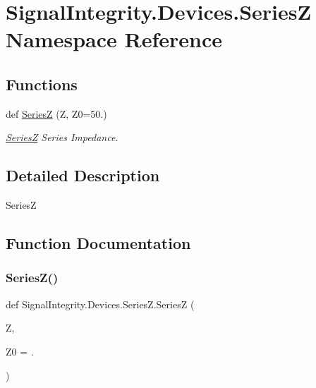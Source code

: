 \hypertarget{namespaceSignalIntegrity_1_1Devices_1_1SeriesZ}{}\section{Signal\+Integrity.\+Devices.\+SeriesZ Namespace Reference}
\label{namespaceSignalIntegrity_1_1Devices_1_1SeriesZ}
\subsection*{Functions}
\begin{DoxyCompactItemize}
\item 
def \hyperlink{namespaceSignalIntegrity_1_1Devices_1_1SeriesZ_a94e0d3ee06984f81d2b4d11727f53719}{SeriesZ} (Z, Z0=50.)
\begin{DoxyCompactList}\small\item\em \hyperlink{namespaceSignalIntegrity_1_1Devices_1_1SeriesZ}{SeriesZ} Series Impedance. \end{DoxyCompactList}\end{DoxyCompactItemize}


\subsection{Detailed Description}
\begin{DoxyVerb}SeriesZ\end{DoxyVerb}
 

\subsection{Function Documentation}
\mbox{\label{namespaceSignalIntegrity_1_1Devices_1_1SeriesZ_a94e0d3ee06984f81d2b4d11727f53719}} 
\subsubsection{\texorpdfstring{Series\+Z()}{SeriesZ()}}
{\footnotesize\ttfamily def Signal\+Integrity.\+Devices.\+Series\+Z.\+SeriesZ (\begin{DoxyParamCaption}\item[{}]{Z,  }\item[{}]{Z0 = {.} }\end{DoxyParamCaption})}



